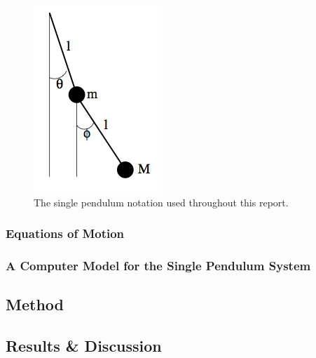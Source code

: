 \documentclass[11pt]{article}
\begin{document}
\begin{figure}
\vspace{-20pt}
\hspace{5pt}
\includegraphics[height=0.3\textheight]{img/dp_diag.png}
\caption{The single pendulum notation used throughout this report.}
\label{fig:dp_diag}
\vspace{-30pt}
\end{figure}

\subsubsection*{Equations of Motion}
\subsubsection*{A Computer Model for the Single Pendulum System}
\subsection{Method}
\subsection{Results \& Discussion}
\end{document}
